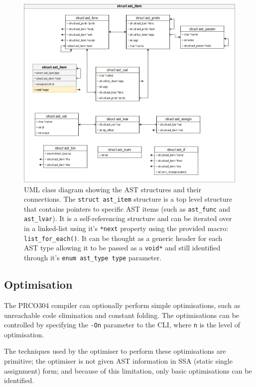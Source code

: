 \documentclass[11pt,a4paper]{report}
\newcommand{\scname}{PRCO304}
\begin{document}
\begin{figure}[H]
\begin{center}
\includegraphics[scale=0.4]{compiler_ast_item}
\end{center}
\caption{UML class diagram showing the AST structures and their connections. The \texttt{struct ast_item} structure is a top level structure that contains pointers to specific AST items (such as \texttt{ast_func} and \texttt{ast_lvar}). It is a self-referencing structure and can be iterated over in a linked-list using it's \texttt{*next} property using the provided macro: \texttt{list_for_each()}. It can be thought as a generic header for each AST type allowing it to be passed as a \texttt{void*} and still identified through it's \texttt{enum ast_type type} parameter.}
\label{fig:compiler_ast_uml}
\end{figure}



\subsection{Optimisation}
The \scname{} compiler can optionally perform simple optimisations, such as unreachable code elimination and constant folding. The optimisations can be controlled by specifying the \verb|-On| parameter to the CLI, where \verb|n| is the level of optimisation.

The techniques used by the optimiser to perform these optimisations are primitive; the optimiser is not given AST information in SSA (static single assignment) form; and because of this limitation, only basic optimisations can be identified.
\end{document}
